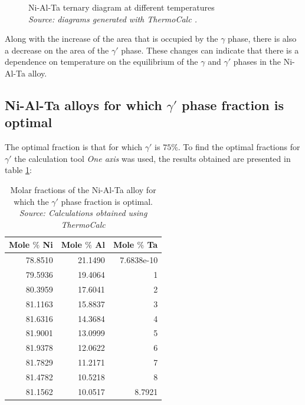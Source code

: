 \begin{figure}[H]
{    }
  \caption[]{\centering Ni-Al-Ta ternary diagram at different temperatures \\
  \textit{Source: diagrams generated with ThermoCalc \citep{thermocalc}.}}
\end{figure}

Along with the increase of the area that is occupied by the $\gamma$ phase, there is also a decrease on the area of the $\gamma'$ phase. These changes can indicate that there is a dependence on temperature on the equilibrium of the $\gamma$ and $\gamma'$ phases in the Ni-Al-Ta alloy.


\newpage
\subsection{Ni-Al-Ta alloys for which $\gamma'$ phase fraction is optimal}

The optimal fraction is that for which $\gamma'$ is $75\%$. To find the optimal fractions for $\gamma'$ the calculation tool \textit{One axis} was used, the results obtained are presented in table \ref{tab:tab02}:

\begin{table}[h]
  \centering
    \begin{tabular}{rrr}
        \multicolumn{1}{c}{\textbf{Mole $\%$ Ni}} & \multicolumn{1}{c}{\textbf{Mole $\%$ Al}} & \multicolumn{1}{c}{\textbf{Mole $\%$ Ta}} \\ \hline \hline
        78.8510 & 21.1490 & 7.6838e-10 \\
        79.5936 & 19.4064 & 1 \\
        80.3959 & 17.6041 & 2 \\
        81.1163 & 15.8837 & 3 \\
        81.6316 & 14.3684 & 4 \\
        81.9001 & 13.0999 & 5 \\
        81.9378 & 12.0622 & 6 \\
        81.7829 & 11.2171 & 7 \\
        81.4782 & 10.5218 & 8 \\
        81.1562 & 10.0517 & 8.7921
    \end{tabular}
  \caption{\centering Molar fractions of the Ni-Al-Ta alloy for which the $\gamma'$ phase fraction is optimal.\\
  \textit{Source: Calculations obtained using ThermoCalc \citep{thermocalc}}}
  \label{tab:tab02}
\end{table}

